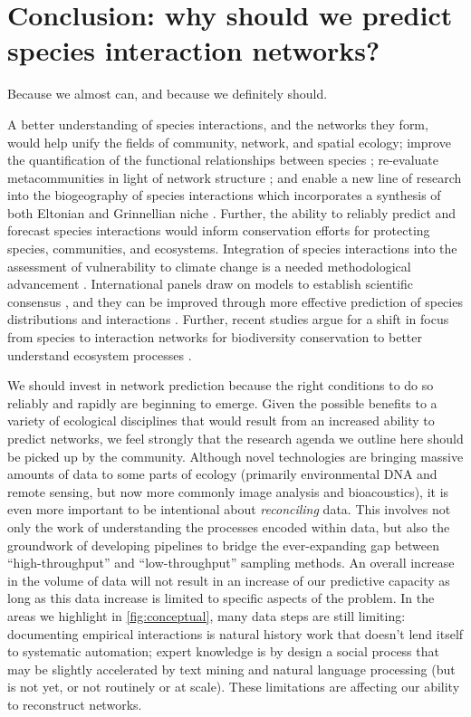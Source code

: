 \section{Conclusion: why should we predict species interaction
networks?}\label{conclusion-why-should-we-predict-species-interaction-networks}

Because we almost can, and because we definitely should.

A better understanding of species interactions, and the networks they
form, would help unify the fields of community, network, and spatial
ecology; improve the quantification of the functional relationships
between species \cite{Dehling2018BriElt, OConnor2020UnvFoo};
re-evaluate metacommunities in light of network structure
\cite{Guzman2019MulExt}; and enable a new line of research into the
biogeography of species interactions \cite{Massol2017ChaFou,
Braga2019SpaAna} which incorporates a synthesis of both Eltonian and
Grinnellian niche \cite{Gravel2019BriElt}. Further, the ability to
reliably predict and forecast species interactions would inform
conservation efforts for protecting species, communities, and
ecosystems. Integration of species interactions into the assessment of
vulnerability to climate change is a needed methodological advancement
\cite{Foden2016IucSsc}. International panels draw on models to establish
scientific consensus \cite{Araujo2019StaDis}, and they can be improved
through more effective prediction of species distributions and
interactions \cite{Syfert2014UsiSpe}. Further, recent studies argue for
a shift in focus from species to interaction networks for biodiversity
conservation to better understand ecosystem processes
\cite{Harvey2017BriEco}.

We should invest in network prediction because the right conditions to
do so reliably and rapidly are beginning to emerge. Given the possible
benefits to a variety of ecological disciplines that would result from
an increased ability to predict networks, we feel strongly that the
research agenda we outline here should be picked up by the community.
Although novel technologies are bringing massive amounts of data to some
parts of ecology (primarily environmental DNA and remote sensing, but
now more commonly image analysis and bioacoustics), it is even more
important to be intentional about \emph{reconciling} data. This involves
not only the work of understanding the processes encoded within data,
but also the groundwork of developing pipelines to bridge the
ever-expanding gap between ``high-throughput'' and ``low-throughput''
sampling methods. An overall increase in the volume of data will not
result in an increase of our predictive capacity as long as this data
increase is limited to specific aspects of the problem. In the areas we
highlight in \autoref{fig:conceptual}, many data steps are still limiting:
documenting empirical interactions is natural history work that doesn't
lend itself to systematic automation; expert knowledge is by design a
social process that may be slightly accelerated by text mining and
natural language processing (but is not yet, or not routinely or at
scale). These limitations are affecting our ability to reconstruct
networks.

